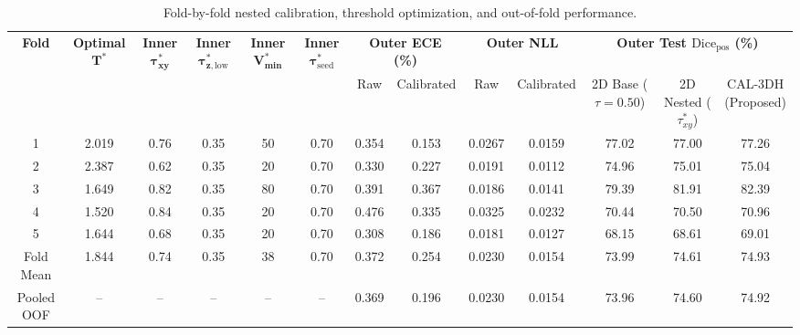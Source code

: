 \documentclass[11pt,a4paper]{article}
\begin{document}
\begin{table}[t]
\centering
\caption{Fold-by-fold nested calibration, threshold optimization, and out-of-fold performance.}
\label{tab:calibration_folds}
\setlength{\tabcolsep}{1.2pt}
\scriptsize
\begin{tabular*}{\textwidth}{@{\extracolsep{\fill}}ccccccccccccc}
\toprule
\textbf{Fold} & \shortstack{\textbf{Optimal} \\ $\mathbf{T^*}$} & \shortstack{\textbf{Inner} \\ $\mathbf{\tau_{xy}^*}$} & \shortstack{\textbf{Inner} \\ $\mathbf{\tau_{z,\mathrm{low}}^*}$} & \shortstack{\textbf{Inner} \\ $\mathbf{V_{\min}^*}$} & \shortstack{\textbf{Inner} \\ $\mathbf{\tau_{\mathrm{seed}}^*}$} & \multicolumn{2}{c}{\textbf{Outer ECE (\%)}} & \multicolumn{2}{c}{\textbf{Outer NLL}} & \multicolumn{3}{c}{\textbf{Outer Test $\text{Dice}_{\text{pos}}$ (\%)}} \\
\cmidrule(lr){7-8} \cmidrule(lr){9-10} \cmidrule(lr){11-13}
& & & & & & Raw & Calibrated & Raw & Calibrated & \shortstack{2D Base \\ ($\tau=0.50$)} & \shortstack{2D Nested \\ ($\tau_{xy}^*$)} & \shortstack{CAL-3DH \\ (Proposed)} \\
\midrule
1 & 2.019 & 0.76 & 0.35 & 50 & 0.70 & 0.354 & 0.153 & 0.0267 & 0.0159 & 77.02 & 77.00 & 77.26 \\
2 & 2.387 & 0.62 & 0.35 & 20 & 0.70 & 0.330 & 0.227 & 0.0191 & 0.0112 & 74.96 & 75.01 & 75.04 \\
3 & 1.649 & 0.82 & 0.35 & 80 & 0.70 & 0.391 & 0.367 & 0.0186 & 0.0141 & 79.39 & 81.91 & 82.39 \\
4 & 1.520 & 0.84 & 0.35 & 20 & 0.70 & 0.476 & 0.335 & 0.0325 & 0.0232 & 70.44 & 70.50 & 70.96 \\
5 & 1.644 & 0.68 & 0.35 & 20 & 0.70 & 0.308 & 0.186 & 0.0181 & 0.0127 & 68.15 & 68.61 & 69.01 \\
\midrule
Fold Mean & 1.844 & 0.74 & 0.35 & 38 & 0.70 & 0.372 & 0.254 & 0.0230 & 0.0154 & 73.99 & 74.61 & 74.93 \\
Pooled OOF & -- & -- & -- & -- & -- & 0.369 & 0.196 & 0.0230 & 0.0154 & 73.96 & 74.60 & 74.92 \\
\bottomrule
\end{tabular*}
\end{table}
\end{document}
